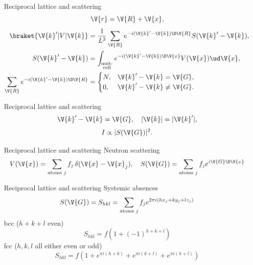 \documentclass{beamer}
\begin{document}
\begin{frame}{Reciprocal lattice and scattering}
\begin{equation*}
	\V{r} = \V{R} + \V{x},
\end{equation*} 
\begin{align*}
	\braket{\V{k}' | V | \V{k}} &= \frac{1}{L^3} \sum_{\V{R}} e^{-i(\V{k}'-\V{k}) \D\V{R}} S(\V{k}'-\V{k}), \\
	S(\V{k}'-\V{k}) &=  \int_{\substack{\text{unit-} \\\text{cell}}} e^{-i (\V{k}'-\V{k}) \D \V{x}} V(\V{x}) \ud \V{x}, \\
	\sum_{\V{R}} e^{-i (\V{k}'-\V{k}) \D \V{R}} &= \begin{cases}
	N, & \V{k}'-\V{k} = \V{G}, \\
	0, & \V{k}'-\V{k} \neq \V{G}.
	\end{cases}
\end{align*}
\end{frame}


\begin{frame}{Reciprocal lattice and scattering}
\begin{equation*}
	\V{k}'-\V{k} = \V{G}, \quad |\V{k}| = |\V{k}'|,
\end{equation*}
\begin{equation*}
	I \propto |S(\V{G})|^2.
\end{equation*}
\end{frame}


\begin{frame}{Reciprocal lattice and scattering}
Neutron scattering
\begin{equation}
	V(\V{x}) = \sum_{\text{atoms } j} f_j \, \delta(\V{x}-\V{x}_j), \quad S(\V{G}) = \sum_{\text{atoms } j} f_j e^{i\V{G} \D \V{x}}
\end{equation}
\end{frame}


\begin{frame}{Reciprocal lattice and scattering}
Systemic absences
\begin{equation}
	S(\V{G}) = S_{hkl} = \sum_{\text{atoms } j} f_j e^{2\pi i(hx_j + ky_j + lz_j)}
\end{equation}
bcc ($ h+k+l $ even)
\begin{equation}
	S_{hkl} = f (1+ (-1)^{h+k+l})
\end{equation}
fcc ($ h,k,l $ all either even or odd)
\begin{equation}
	S_{hkl} = f (1+ e^{\pi i(h+k)} + e^{\pi i(k+l)} + e^{\pi i(h+l)})
\end{equation}
\end{frame}
\end{document}
